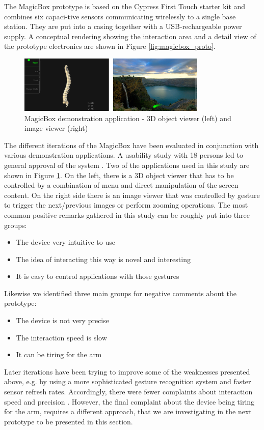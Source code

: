 The MagicBox prototype is based on the Cypress First Touch starter kit \cite{cypressfirst} and combines six capaci-tive sensors communicating wirelessly to a single base station. They are put into a casing together with a USB-rechargeable power supply. A conceptual rendering showing the interaction area and a detail view of the prototype electronics are shown in Figure \ref{fig:magicbox_proto}.

\begin{figure}[ht]
\centering
\includegraphics[width=0.8\textwidth]{images/magicbox_eval}
\caption{MagicBox demonstration application - 3D object viewer (left) and image viewer (right) \cite{Braun2011MultiInputDevice}}
\label{fig:magicbox_eval}
\end{figure}

The different iterations of the MagicBox have been evaluated in conjunction with various demonstration applications. A usability study with 18 persons led to general approval of the system \cite{Braun2011MultiInputDevice}. Two of the applications used in this study are shown in Figure \ref{fig:magicbox_eval}. On the left, there is a 3D object viewer that has to be controlled by a combination of menu and direct manipulation of the screen content. On the right side there is an image viewer that was controlled by gesture to trigger the next/previous images or perform zooming operations. The most common positive remarks gathered in this study can be roughly put into three groups:
\begin{itemize}
\item{The device very intuitive to use}
\item{The idea of interacting this way is novel and interesting}
\item{It is easy to control applications with those gestures}
\end{itemize}
Likewise we identified three main groups for negative comments about the prototype:
\begin{itemize}
\item{The device is not very precise}
\item{The interaction speed is slow}
\item{It can be tiring for the arm}
\end{itemize}
Later iterations have been trying to improve some of the weaknesses presented above, e.g. by using a more sophisticated gesture recognition system and faster sensor refresh rates. Accordingly, there were fewer complaints about interaction speed and precision \cite{braun2013capacitive}. However, the final complaint about the device being tiring for the arm, requires a different approach, that we are investigating in the next prototype to be presented in this section.

